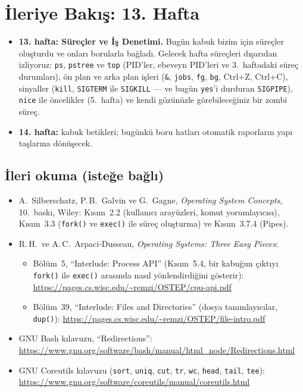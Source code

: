 \documentclass[11pt,a4paper]{article}
\newcommand{\cmd}[1]{\texttt{#1}}
\begin{document}
\section{İleriye Bakış: 13. Hafta}

\begin{itemize}
  \item \textbf{13. hafta: Süreçler ve İş Denetimi.} Bugün kabuk bizim için süreçler oluşturdu ve onları borularla bağladı. Gelecek hafta süreçleri dışarıdan izliyoruz: \cmd{ps}, \cmd{pstree} ve \cmd{top} (PID'ler, ebeveyn PID'leri ve 3.~haftadaki süreç durumları), ön plan ve arka plan işleri (\cmd{\&}, \cmd{jobs}, \cmd{fg}, \cmd{bg}, Ctrl+Z, Ctrl+C), sinyaller (\cmd{kill}, \texttt{SIGTERM} ile \texttt{SIGKILL} --- ve bugün \cmd{yes}'i durduran \texttt{SIGPIPE}), \cmd{nice} ile öncelikler (5.~hafta) ve kendi gözünüzle görebileceğiniz bir zombi süreç.
  \item \textbf{14. hafta:} kabuk betikleri; bugünkü boru hatları otomatik raporların yapı taşlarına dönüşecek.
\end{itemize}

\subsection*{İleri okuma (isteğe bağlı)}
\begin{itemize}
  \item A.\ Silberschatz, P.\,B.\ Galvin ve G.\ Gagne, \emph{Operating System Concepts}, 10.\ baskı, Wiley: Kısım~2.2 (kullanıcı arayüzleri, komut yorumlayıcısı), Kısım~3.3 (\cmd{fork()} ve \cmd{exec()} ile süreç oluşturma) ve Kısım~3.7.4 (Pipes).
  \item R.\,H.\ ve A.\,C.\ Arpaci-Dusseau, \emph{Operating Systems: Three Easy Pieces}:
  \begin{itemize}
    \item Bölüm~5, ``Interlude: Process API'' (Kısım~5.4, bir kabuğun çıktıyı \cmd{fork()} ile \cmd{exec()} arasında nasıl yönlendirdiğini gösterir): \url{https://pages.cs.wisc.edu/~remzi/OSTEP/cpu-api.pdf}
    \item Bölüm~39, ``Interlude: Files and Directories'' (dosya tanımlayıcılar, \cmd{dup()}): \url{https://pages.cs.wisc.edu/~remzi/OSTEP/file-intro.pdf}
  \end{itemize}
  \item GNU Bash kılavuzu, ``Redirections'': \url{https://www.gnu.org/software/bash/manual/html_node/Redirections.html}
  \item GNU Coreutils kılavuzu (\cmd{sort}, \cmd{uniq}, \cmd{cut}, \cmd{tr}, \cmd{wc}, \cmd{head}, \cmd{tail}, \cmd{tee}): \url{https://www.gnu.org/software/coreutils/manual/coreutils.html}
\end{itemize}
\end{document}
